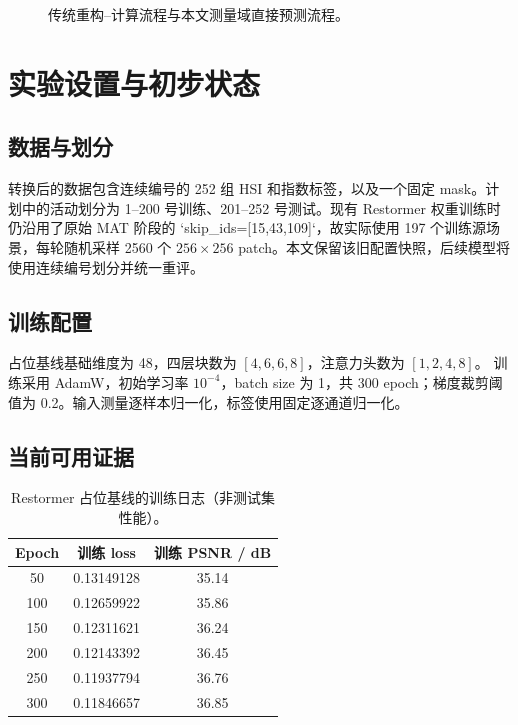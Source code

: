 \documentclass[UTF8,12pt,a4paper]{ctexart}
\begin{document}
\begin{figure}[htbp]
  \centering
  \caption{传统重构--计算流程与本文测量域直接预测流程。}
  \label{fig:pipeline}
\end{figure}

\section{实验设置与初步状态}

\subsection{数据与划分}
转换后的数据包含连续编号的 252 组 HSI 和指数标签，以及一个固定 mask。计划中的活动划分为
1--200 号训练、201--252 号测试。现有 Restormer 权重训练时仍沿用了原始 MAT 阶段的
`skip\_ids=[15,43,109]`，故实际使用 197 个训练源场景，每轮随机采样 2560 个
$256\times256$ patch。本文保留该旧配置快照，后续模型将使用连续编号划分并统一重评。

\subsection{训练配置}
占位基线基础维度为 48，四层块数为 $[4,6,6,8]$，注意力头数为 $[1,2,4,8]$。
训练采用 AdamW，初始学习率 $10^{-4}$，batch size 为 1，共 300 epoch；梯度裁剪阈值为
0.2。输入测量逐样本归一化，标签使用固定逐通道归一化。

\subsection{当前可用证据}
\begin{table}[htbp]
  \centering
  \caption{Restormer 占位基线的训练日志（非测试集性能）。}
  \begin{tabular}{ccc}
    \toprule
    Epoch & 训练 loss & 训练 PSNR / dB \\
    \midrule
    50  & 0.13149128 & 35.14 \\
    100 & 0.12659922 & 35.86 \\
    150 & 0.12311621 & 36.24 \\
    200 & 0.12143392 & 36.45 \\
    250 & 0.11937794 & 36.76 \\
    300 & 0.11846657 & 36.85 \\
    \bottomrule
  \end{tabular}
\end{table}
\end{document}
